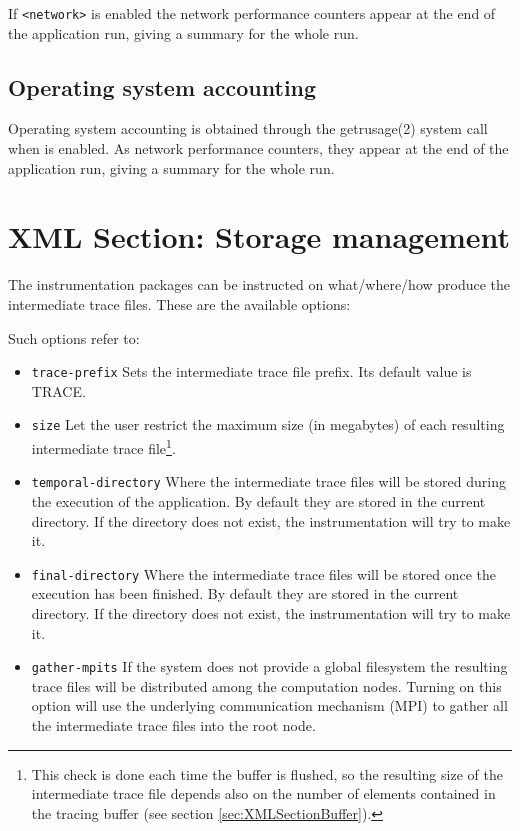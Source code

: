If {\tt <network>} is enabled the network performance counters appear at the end of the application run, giving a summary for the whole run.

\subsection{Operating system accounting}\label{subsec:OperatingSystemAccounting}

Operating system accounting is obtained through the getrusage(2) system call when {\tt <resource-usage>} is enabled. As network performance counters, they appear at the end of the application run, giving a summary for the whole run.

\section{XML Section: Storage management}\label{sec:XMLSectionStorage}

The instrumentation packages can be instructed on what/where/how produce the intermediate trace files. These are the available options:



Such options refer to:

\begin{itemize}
 \item {\tt trace-prefix} Sets the intermediate trace file prefix. Its default value is {TRACE}.
 \item {\tt size} Let the user restrict the maximum size (in megabytes) of each resulting intermediate trace file\footnote{This check is done each time the buffer is flushed, so the resulting size of the intermediate trace file depends also on the number of elements contained in the tracing buffer (see section \ref{sec:XMLSectionBuffer}).}.
 \item {\tt temporal-directory} Where the intermediate trace files will be stored during the execution of the application. By default they are stored in the current directory. If the directory does not exist, the instrumentation will try to make it.\\
 \item {\tt final-directory} Where the intermediate trace files will be stored once the execution has been finished. By default they are stored in the current directory. If the directory does not exist, the instrumentation will try to make it.\\
 \item {\tt gather-mpits} If the system does not provide a global filesystem the resulting trace files will be distributed among the computation nodes. Turning on this option will use the underlying communication mechanism ({MPI}) to gather all the intermediate trace files into the root node.
\end{itemize}

